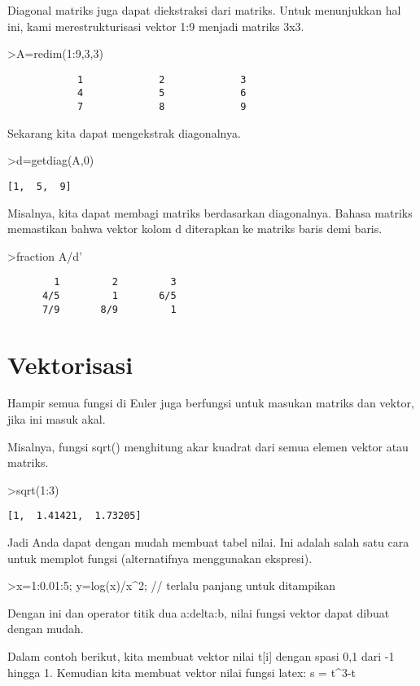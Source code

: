 \documentclass[
]{book}
\begin{document}
Diagonal matriks juga dapat diekstraksi dari matriks. Untuk menunjukkan hal ini, kami merestrukturisasi vektor 1:9 menjadi matriks 3x3.

\textgreater A=redim(1:9,3,3)

\begin{verbatim}
            1             2             3 
            4             5             6 
            7             8             9 
\end{verbatim}

Sekarang kita dapat mengekstrak diagonalnya.

\textgreater d=getdiag(A,0)

\begin{verbatim}
[1,  5,  9]
\end{verbatim}

Misalnya, kita dapat membagi matriks berdasarkan diagonalnya. Bahasa matriks memastikan bahwa vektor kolom d diterapkan ke matriks baris demi baris.

\textgreater fraction A/d'

\begin{verbatim}
        1         2         3 
      4/5         1       6/5 
      7/9       8/9         1 
\end{verbatim}

\chapter{Vektorisasi}\label{vektorisasi}

Hampir semua fungsi di Euler juga berfungsi untuk masukan matriks dan vektor, jika ini masuk akal.

Misalnya, fungsi sqrt() menghitung akar kuadrat dari semua elemen vektor atau matriks.

\textgreater sqrt(1:3)

\begin{verbatim}
[1,  1.41421,  1.73205]
\end{verbatim}

Jadi Anda dapat dengan mudah membuat tabel nilai. Ini adalah salah satu cara untuk memplot fungsi (alternatifnya menggunakan ekspresi).

\textgreater x=1:0.01:5; y=log(x)/x\^{}2; // terlalu panjang untuk ditampikan

Dengan ini dan operator titik dua a:delta:b, nilai fungsi vektor dapat dibuat dengan mudah.

Dalam contoh berikut, kita membuat vektor nilai t{[}i{]} dengan spasi 0,1 dari -1 hingga 1. Kemudian kita membuat vektor nilai fungsi latex: s = t\^{}3-t
\end{document}
